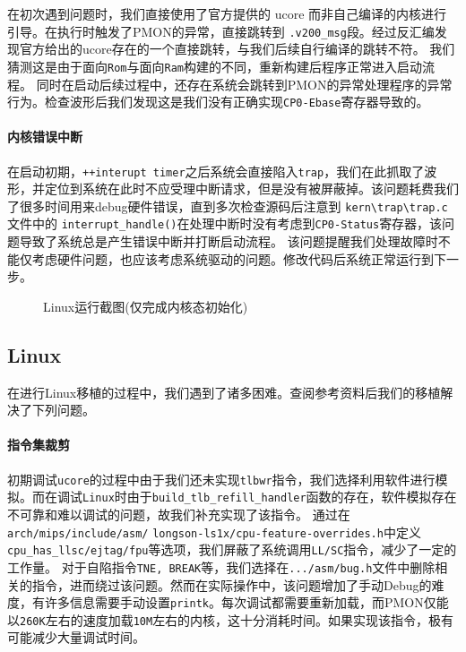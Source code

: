 在初次遇到问题时，我们直接使用了官方提供的 ucore
而非自己编译的内核进行引导。在执行时触发了PMON的异常，直接跳转到
\texttt{.v200\_msg}段。经过反汇编发现官方给出的ucore存在的一个直接跳转，与我们后续自行编译的跳转不符。
我们猜测这是由于面向\texttt{Rom}与面向\texttt{Ram}构建的不同，重新构建后程序正常进入启动流程。
同时在启动后续过程中，还存在系统会跳转到PMON的异常处理程序的异常行为。检查波形后我们发现这是我们没有正确实现\texttt{CP0-Ebase}寄存器导致的。

\hypertarget{ux5185ux6838ux9519ux8befux4e2dux65ad}{%
\paragraph{内核错误中断}\label{ux5185ux6838ux9519ux8befux4e2dux65ad}}

在启动初期，\texttt{++interupt\ timer}之后系统会直接陷入\texttt{trap}，我们在此抓取了波形，并定位到系统在此时不应受理中断请求，但是没有被屏蔽掉。该问题耗费我们了很多时间用来debug硬件错误，直到多次检查源码后注意到
\texttt{kern\textbackslash{}trap\textbackslash{}trap.c} 文件中的
\texttt{interrupt\_handle()}在处理中断时没有考虑到\texttt{CP0-Status}寄存器，该问题导致了系统总是产生错误中断并打断启动流程。
该问题提醒我们处理故障时不能仅考虑硬件问题，也应该考虑系统驱动的问题。修改代码后系统正常运行到下一步。

\begin{figure}[ht]
	\centering
	\quad
	\caption{Linux运行截图(仅完成内核态初始化)}
	\label{fig:linux}
\end{figure}

\hypertarget{linux}{%
\subsection{Linux}\label{linux}}

在进行Linux移植的过程中，我们遇到了诸多困难。查阅参考资料后我们的移植解决了下列问题。

\hypertarget{ux6307ux4ee4ux96c6ux88c1ux526a}{%
\paragraph{指令集裁剪}\label{ux6307ux4ee4ux96c6ux88c1ux526a}}

初期调试\texttt{ucore}的过程中由于我们还未实现\texttt{tlbwr}指令，我们选择利用软件进行模拟。而在调试\texttt{Linux}时由于\texttt{build\_tlb\_refill\_handler}函数的存在，软件模拟存在不可靠和难以调试的问题，故我们补充实现了该指令。
通过在\texttt{arch/mips/include/asm/} \texttt{longson-ls1x/cpu-feature-overrides.h}中定义\texttt{cpu\_has\_llsc/ejtag/fpu}等选项，我们屏蔽了系统调用\texttt{LL/SC}指令，减少了一定的工作量。
对于自陷指令\texttt{TNE,\ BREAK}等，我们选择在\texttt{.../asm/bug.h}文件中删除相关的指令，进而绕过该问题。然而在实际操作中，该问题增加了手动Debug的难度，有许多信息需要手动设置\texttt{printk}。每次调试都需要重新加载，而PMON仅能以\texttt{260K}左右的速度加载\texttt{10M}左右的内核，这十分消耗时间。如果实现该指令，极有可能减少大量调试时间。

